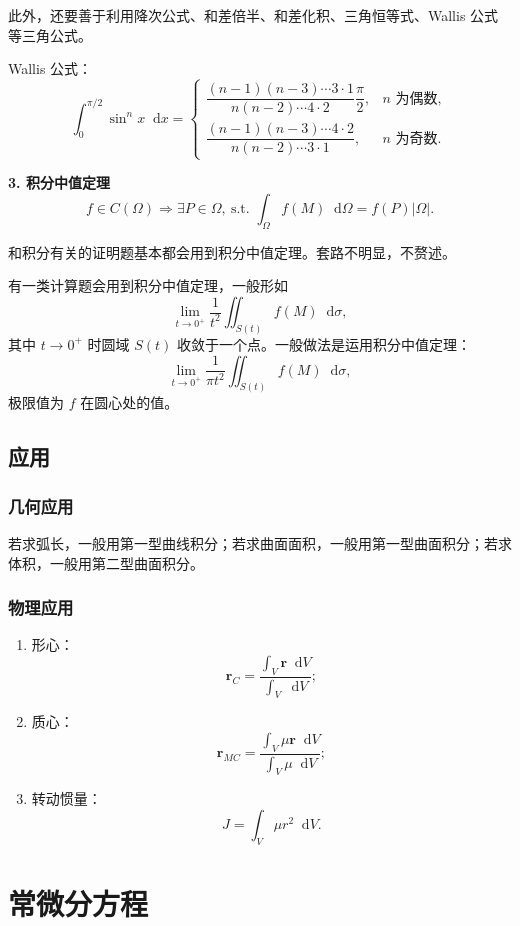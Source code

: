 \documentclass[UTF8,fontset=fandol,zihao=5]{ctexart}
\newcommand{\dd}{\mathop{}\!\mathrm{d}}
\begin{document}
此外，还要善于利用降次公式、和差倍半、和差化积、三角恒等式、Wallis 公式等三角公式。

Wallis 公式：
\[
\int_0^{\pi/2}\sin^n x\dd x=
\begin{cases}
\dfrac{(n-1)(n-3)\cdots3\cdot1}{n(n-2)\cdots4\cdot2}\dfrac{\pi}{2},&n\text{ 为偶数},\\[6pt]
\dfrac{(n-1)(n-3)\cdots4\cdot2}{n(n-2)\cdots3\cdot1},&n\text{ 为奇数}.
\end{cases}
\]

\textbf{3. 积分中值定理}
\[
f\in C(\Omega)\Longrightarrow
\exists P\in\Omega,\ \text{s.t. }
\int_{\Omega}f(M)\dd\Omega=f(P)|\Omega|.
\]

和积分有关的证明题基本都会用到积分中值定理。套路不明显，不赘述。

有一类计算题会用到积分中值定理，一般形如
\[
\lim_{t\to0^+}\frac{1}{t^2}\iint_{S(t)}f(M)\dd\sigma,
\]
其中 $t\to0^+$ 时圆域 $S(t)$ 收敛于一个点。一般做法是运用积分中值定理：
\[
\lim_{t\to0^+}\frac{1}{\pi t^2}\iint_{S(t)}f(M)\dd\sigma,
\]
极限值为 $f$ 在圆心处的值。

\subsection{应用}

\subsubsection{几何应用}

若求弧长，一般用第一型曲线积分；若求曲面面积，一般用第一型曲面积分；若求体积，一般用第二型曲面积分。

\subsubsection{物理应用}

\begin{enumerate}
  \item 形心：
  \[
  \bm r_C=\frac{\displaystyle\int_V\bm r\dd V}{\displaystyle\int_V\dd V};
  \]
  \item 质心：
  \[
  \bm r_{MC}=\frac{\displaystyle\int_V\mu\bm r\dd V}{\displaystyle\int_V\mu\dd V};
  \]
  \item 转动惯量：
  \[
  J=\int_V\mu r^2\dd V.
  \]
\end{enumerate}

\section{常微分方程}
\end{document}
